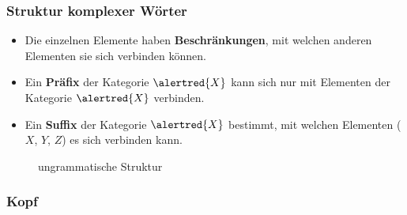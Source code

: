 \begin{frame}
\frametitle{Struktur komplexer Wörter}

\begin{minipage}{.66\textwidth}

\begin{itemize}
	
	\item Die einzelnen Elemente haben \textbf{Beschränkungen}, mit welchen anderen Elementen sie sich verbinden können.

\pause 
	
	\item Ein \textbf{Präfix} der Kategorie $\alertred{X}$ kann sich nur mit Elementen der Kategorie $\alertred{X}$ verbinden.

	\z 	

	
	\item Ein \textbf{Suffix} der Kategorie $\alertred{X}$ bestimmt, mit welchen Elementen (\zB $X$, $Y$, $Z$) es sich verbinden kann.
	
	\z 
\end{itemize}

\end{minipage}
%
\hfill%
%
\begin{minipage}{.32\textwidth}

\begin{figure}	
\centering
{}
\caption{ungrammatische Struktur}
\end{figure}

\end{minipage}
\end{frame}


\subsubsection{Kopf}


